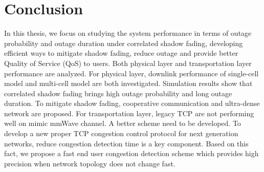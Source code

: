 \chapter{Conclusion}\label{ch:6}
\par In this thesis, we focus on studying the system performance in terms of outage probability and outage duration under correlated shadow fading, developing efficient ways to mitigate shadow fading, reduce outage and provide better Quality of Service (QoS) to users. Both physical layer and transportation layer performance are analyzed. For physical layer, downlink performance of single-cell model and multi-cell model are both investigated. Simulation results show that correlated shadow fading brings high outage probability and long outage duration. To mitigate shadow fading, cooperative communication and ultra-dense network are proposed. For transportation layer, legacy TCP are not performing well on mimic mmWave channel. A better scheme need to be developed. To develop a new proper TCP congestion control protocol for next generation networks, reduce congestion detection time is a key component. Based on this fact, we propose a fast end user congestion detection scheme which provides high precision when network topology does not change fast.
